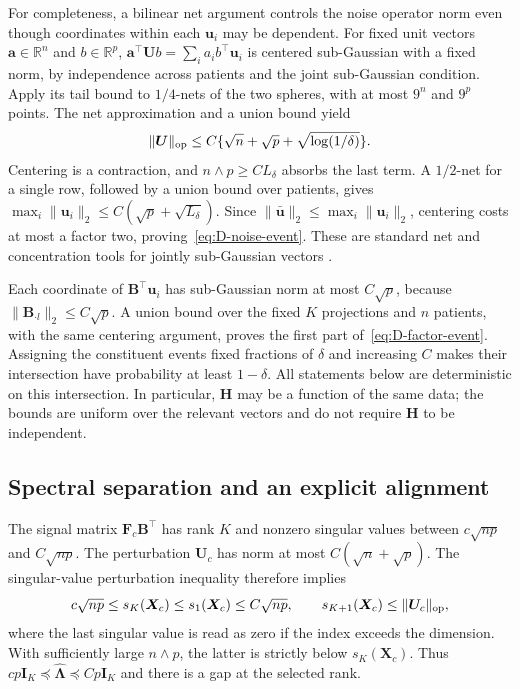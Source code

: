 For completeness, a bilinear net argument controls the noise operator norm even though coordinates within each $\bm{u}_i$ may be dependent. For fixed unit vectors $\bm{a}\in\mathbb R^n$ and $b\in\mathbb R^p$, $\bm{a}^\top \bm{U}b=\sum_i a_i b^\top \bm{u}_i$ is centered sub-Gaussian with a fixed norm, by independence across patients and the joint sub-Gaussian condition. Apply its tail bound to $1/4$-nets of the two spheres, with at most $9^n$ and $9^p$ points. The net approximation and a union bound yield
\[
 \|\bm{U}\|_{\rm op}\le C\{\sqrt n+\sqrt p+\sqrt{\log(1/\delta)}\}.
\]
Centering is a contraction, and $n\wedge p\ge CL_\delta$ absorbs the last term. A $1/2$-net for a single row, followed by a union bound over patients, gives $\max_i\|\bm{u}_i\|_2\le C(\sqrt p+\sqrt{L_\delta})$. Since $\|\bar{\bm{u}}\|_2\le\max_i\|\bm{u}_i\|_2$, centering costs at most a factor two, proving~\eqref{eq:D-noise-event}. These are standard net and concentration tools for jointly sub-Gaussian vectors \citep{Vershynin2012}.

Each coordinate of $\bm{B}^\top \bm{u}_i$ has sub-Gaussian norm at most $C\sqrt p$, because $\|\bm{B}_{\cdot l}\|_2\le C\sqrt p$. A union bound over the fixed $K$ projections and $n$ patients, with the same centering argument, proves the first part of~\eqref{eq:D-factor-event}. Assigning the constituent events fixed fractions of $\delta$ and increasing $C$ makes their intersection have probability at least $1-\delta$. All statements below are deterministic on this intersection. In particular, $\bm{H}$ may be a function of the same data; the bounds are uniform over the relevant vectors and do not require $\bm{H}$ to be independent.

\subsection{Spectral separation and an explicit alignment}
\label{subapp:pca-alignment-proof}
The signal matrix $\bm{F}_c\bm{B}^\top$ has rank $K$ and nonzero singular values between $c\sqrt{np}$ and $C\sqrt{np}$. The perturbation $\bm{U}_c$ has norm at most $C(\sqrt n+\sqrt p)$. The singular-value perturbation inequality therefore implies
\[
 c\sqrt{np}\le s_K(\bm{X}_c)\le s_1(\bm{X}_c)\le C\sqrt{np},
 \qquad s_{K+1}(\bm{X}_c)\le\|\bm{U}_c\|_{\rm op},
\]
where the last singular value is read as zero if the index exceeds the dimension. With sufficiently large $n\wedge p$, the latter is strictly below $s_K(\bm{X}_c)$. Thus $cp\bm{I}_K\preceq\widehat{\bm{\Lambda}}\preceq Cp\bm{I}_K$ and there is a gap at the selected rank.

